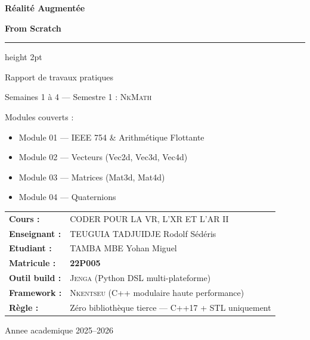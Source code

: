 \documentclass[12pt,a4paper]{report}
\newcommand{\nkmath}{\textsc{NkMath}}
\newcommand{\nkentseu}{\textsc{Nkentseu}}
\newcommand{\jenga}{\textsc{Jenga}}
\begin{document}
\begin{titlepage}
\begin{center}

\vspace*{1.5cm}

{\Huge \bfseries \textcolor{myblue}{Réalité Augmentée}\par}
{\Huge \bfseries \textcolor{myblue}{From Scratch}\par}

\vspace{0.5cm}
\hrule height 2pt
\vspace{0.5cm}

{\LARGE Rapport de travaux pratiques}\par
{\Large Semaines 1 à 4 — Semestre 1 : \nkmath}\par

\vspace{1cm}

{\large
Modules couverts :
\begin{itemize}
    \item Module 01 — IEEE 754 \& Arithmétique Flottante
    \item Module 02 — Vecteurs (Vec2d, Vec3d, Vec4d)
    \item Module 03 — Matrices (Mat3d, Mat4d)
    \item Module 04 — Quaternions
\end{itemize}
}

\vspace{1cm}

\begin{tabular}{ll}
\textbf{Cours :}     & CODER POUR LA VR, L'XR ET L'AR II \\
\textbf{Enseignant :} & TEUGUIA TADJUIDJE Rodolf Sédéris \\
\textbf{Etudiant :}     & TAMBA MBE Yohan Miguel \\
\textbf{Matricule :} & \textbf{22P005} \\
\textbf{Outil build :} & \jenga{} (Python DSL multi-plateforme) \\
\textbf{Framework :} & \nkentseu{} (C++ modulaire haute performance) \\
\textbf{Règle :}     & Zéro bibliothèque tierce — C++17 + STL uniquement \\
\end{tabular}

\vfill{\large Annee academique 2025--2026}

\end{center}
\end{titlepage}
\end{document}
